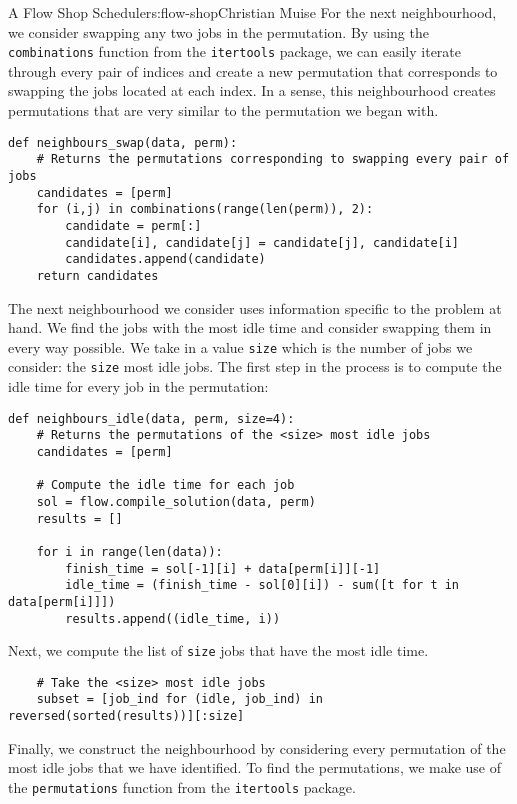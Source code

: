 \begin{aosachapter}{A Flow Shop Scheduler}{s:flow-shop}{Christian Muise}
For the next neighbourhood, we consider swapping any two jobs in the
permutation. By using the \texttt{combinations} function from the
\texttt{itertools} package, we can easily iterate through every pair of
indices and create a new permutation that corresponds to swapping the
jobs located at each index. In a sense, this neighbourhood creates
permutations that are very similar to the permutation we began with.

\begin{verbatim}
def neighbours_swap(data, perm):
    # Returns the permutations corresponding to swapping every pair of jobs
    candidates = [perm]
    for (i,j) in combinations(range(len(perm)), 2):
        candidate = perm[:]
        candidate[i], candidate[j] = candidate[j], candidate[i]
        candidates.append(candidate)
    return candidates
\end{verbatim}

The next neighbourhood we consider uses information specific to the
problem at hand. We find the jobs with the most idle time and consider
swapping them in every way possible. We take in a value \texttt{size}
which is the number of jobs we consider: the \texttt{size} most idle
jobs. The first step in the process is to compute the idle time for
every job in the permutation:

\begin{verbatim}
def neighbours_idle(data, perm, size=4):
    # Returns the permutations of the <size> most idle jobs
    candidates = [perm]

    # Compute the idle time for each job
    sol = flow.compile_solution(data, perm)
    results = []

    for i in range(len(data)):
        finish_time = sol[-1][i] + data[perm[i]][-1]
        idle_time = (finish_time - sol[0][i]) - sum([t for t in data[perm[i]]])
        results.append((idle_time, i))
\end{verbatim}

Next, we compute the list of \texttt{size} jobs that have the most idle
time.

\begin{verbatim}
    # Take the <size> most idle jobs
    subset = [job_ind for (idle, job_ind) in reversed(sorted(results))][:size]
\end{verbatim}

Finally, we construct the neighbourhood by considering every permutation
of the most idle jobs that we have identified. To find the permutations,
we make use of the \texttt{permutations} function from the
\texttt{itertools} package.


\end{aosachapter}
